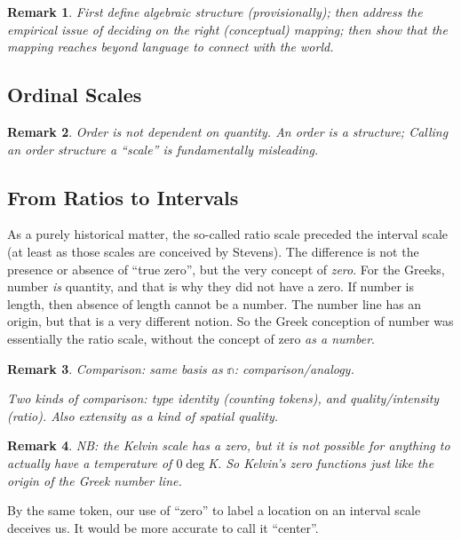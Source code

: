 \documentclass[11pt,twoside]{article}
\newtheorem{remark}{Remark}
\begin{document}
\begin{remark}
  First define algebraic structure (provisionally); then address the
  empirical issue of deciding on the right (conceptual) mapping; then
  show that the mapping reaches beyond language to connect with the
  world.
\end{remark}

\subsection{Ordinal Scales}

\begin{remark}
  Order is not dependent on quantity.  An order is a structure;
  Calling an order structure a ``scale'' is fundamentally misleading.
\end{remark}

\subsection{From Ratios to Intervals}

As a purely historical matter, the so-called ratio scale preceded the
interval scale (at least as those scales are conceived by Stevens).
The difference is not the presence or absence of ``true zero'', but
the very concept of \textit{zero}.  For the Greeks, number \textit{is}
quantity, and that is why they did not have a zero.  If number is
length, then absence of length cannot be a number.  The number line
has an origin, but that is a very different notion.  So the Greek
conception of number was essentially the ratio scale, without the
concept of zero \textit{as a number}.

\begin{remark}
  Comparison: same basis as \(\mathbb{n}\): comparison/analogy.

Two kinds of comparison: type identity (counting tokens), and
quality/intensity (ratio).  Also extensity as a kind of spatial
quality.

\end{remark}

\begin{remark}
  NB: the Kelvin scale has a zero, but it is not possible for anything
  to actually have a temperature of $0\deg$K.  So Kelvin's zero
  functions just like the origin of the Greek number line.
\end{remark}

By the same token, our use of ``zero'' to label a location on an
interval scale deceives us.  It would be more accurate to call it
``center''.
\end{document}
